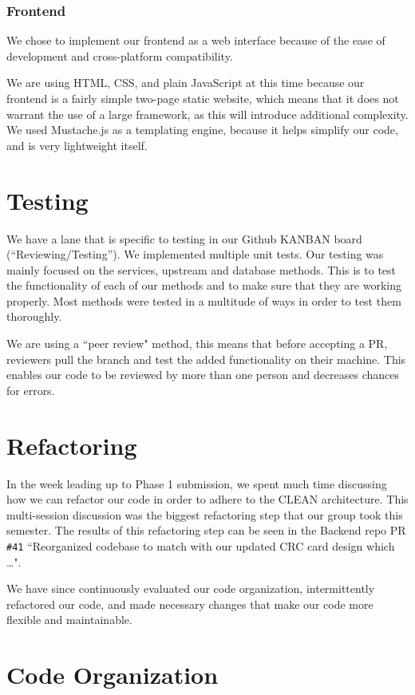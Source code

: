 \documentclass[fontsize=14pt]{article}
\def\code#1{\texttt{#1}}
\begin{document}
\subsubsection*{Frontend}
We chose to implement our frontend as a web interface because of the ease of development and cross-platform compatibility. 

We are using HTML, CSS, and plain JavaScript at this time because our frontend is a fairly simple two-page static website, which means that it does not warrant the use of a large framework, as this will introduce additional complexity. We used Mustache.js as a templating engine, because it helps simplify our code, and is very lightweight itself.

\section*{Testing}
We have a lane that is specific to testing in our Github KANBAN board (``Reviewing/Testing''). We implemented multiple unit tests. Our testing was mainly focused on the services, upstream and database methods. This is to test the functionality of each of our methods and to make sure that they are working properly. Most methods were tested in a multitude of ways in order to test them thoroughly.

We are using a ``peer review" method, this means that before accepting a PR, reviewers pull the branch and test the added functionality on their machine. This enables our code to be reviewed by more than one person and decreases chances for errors.

\section*{Refactoring}

In the week leading up to Phase 1 submission, we spent much time discussing how we can refactor our code in order to adhere to the CLEAN architecture. This multi-session discussion was the biggest refactoring step that our group took this semester. The results of this refactoring step can be seen in the Backend repo PR \code{\#41} ``Reorganized codebase to match with our updated CRC card design which …". 

We have since continuously evaluated our code organization, intermittently refactored our code, and made necessary changes that make our code more flexible and maintainable.

\section*{Code Organization}
\end{document}

